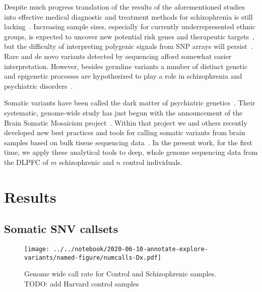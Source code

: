\documentclass[letterpaper]{article}
\begin{document}
Despite much progress translation of the results of the aforementioned studies
into effective medical diagnostic and treatment methods for schizophrenia is
still lacking~\cite{Breen2016,Foley2017}. Increasing sample sizes, especially
for currently underrepresented ethnic groups, is expected to uncover new
potential risk genes and therapeutic targets~\cite{Visscher2017}, but the difficulty of interpreting
polygenic signals from SNP arrays will persist~\cite{Boyle2017}.  Rare and de
novo variants detected by sequencing afford somewhat easier interpretation.
However, besides germline variants a number of distinct genetic and epigenetic
processes are hypothesized to play a role in schizophrenia and psychiatric
disorders~\cite{PsychENCODEConsortium2015}.

Somatic variants have been called the dark matter of psychiatric
genetics~\cite{Insel2014}.  Their systematic, genome-wide study has just begun
with the announcement of the Brain Somatic Mosaicism
project~\cite{McConnell2017}.  Within that project we and others recently
developed new best practices and tools for calling somatic variants from brain
samples based on bulk tissue sequencing data~\cite{Wang2021}.  In the present
work, for the first time, we apply these analytical tools to deep, whole
genome sequencing data from the DLPFC of \(m\) schizophrenic and \(n\) control
individuals.


\section*{Results}

\subsection*{Somatic SNV callsets}

\begin{figure}
\texttt{[image: ../../notebook/2020-06-10-annotate-explore-variants/named-figure/numcalls-Dx.pdf]}

\caption{Genome wide call rate for Control and Schizophrenic samples.  TODO:
	add Harvard control samples}
\end{figure}
\end{document}
